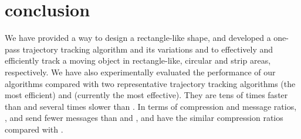 
\section{conclusion}
\label{sec-conclusion}

We have provided a way to design a rectangle-like shape, and developed a one-pass trajectory tracking algorithm \bitt and its variations \citt and \sitt to effectively and efficiently track a moving object in rectangle-like, circular and strip areas, respectively.
We have also experimentally evaluated the performance of our algorithms compared with two representative trajectory tracking algorithms \ldrh (the most efficient) and \grts (currently the most effective). 
They are tens of times faster than \grts and several times slower than \ldrh.
In terms of compression and message ratios, \bitt, \citt and \sitt send fewer messages than \grts and \ldrh, and have the similar compression ratios compared with \grts.

